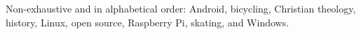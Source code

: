 
\inlineheadsection %
{Non-exhaustive and in alphabetical order:}
{
Android, bicycling, Christian theology, history, Linux, open source, Raspberry Pi, skating, and Windows.
}
